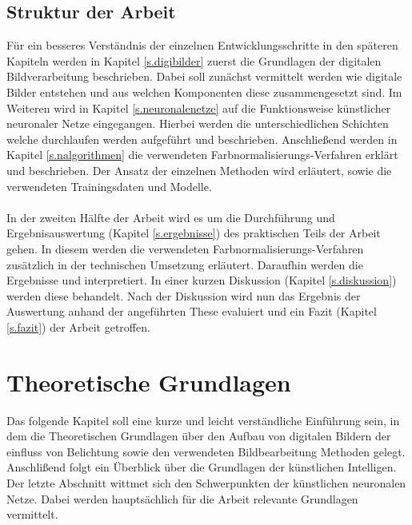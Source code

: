 \documentclass[a4paper,12pt,oneside]{article}
\begin{document}
  \subsection{Struktur der Arbeit}\label{Struktur} 
Für ein besseres Verständnis der einzelnen Entwicklungsschritte in den späteren Kapiteln werden in Kapitel \ref{s.digibilder} zuerst die Grundlagen der digitalen Bildverarbeitung beschrieben. Dabei soll zunächst vermittelt werden wie digitale Bilder entstehen und aus welchen Komponenten diese zusammengesetzt sind. Im Weiteren wird in Kapitel \ref{s.neuronalenetze} auf die Funktionsweise künstlicher neuronaler Netze eingegangen. Hierbei werden die unterschiedlichen Schichten welche durchlaufen werden aufgeführt und beschrieben. Anschließend werden in Kapitel \ref{s.nalgorithmen} die verwendeten Farbnormalisierungs-Verfahren erklärt und beschrieben. Der Ansatz der einzelnen Methoden wird erläutert, sowie die verwendeten Trainingsdaten und Modelle.\\\\
In der zweiten Hälfte der Arbeit wird es um die Durchführung und Ergebnisauswertung (Kapitel \ref{s.ergebnisse}) des praktischen Teils der Arbeit gehen. In diesem werden die verwendeten Farbnormalisierungs-Verfahren zusätzlich in der technischen Umsetzung erläutert. Daraufhin werden die Ergebnisse und interpretiert. In einer kurzen Diskussion (Kapitel \ref{s.diskussion}) werden diese behandelt. Nach der Diskussion wird nun das Ergebnis der Auswertung anhand der angeführten These evaluiert und ein Fazit (Kapitel \ref{s.fazit}) der Arbeit getroffen.
  \newpage
  \section{Theoretische Grundlagen}\label{s.grundlagen}
  Das folgende Kapitel soll eine kurze und leicht verständliche Einführung sein, in dem die Theoretischen Grundlagen über den Aufbau von digitalen Bildern der einfluss von Belichtung sowie den verwendeten Bildbearbeitung Methoden gelegt. Anschlißend folgt ein Überblick über die Grundlagen der künstlichen Intelligen. Der letzte Abschnitt wittmet sich den Schwerpunkten der künstlichen neuronalen Netze. Dabei werden hauptsächlich für die Arbeit relevante Grundlagen vermittelt. 
\end{document}
